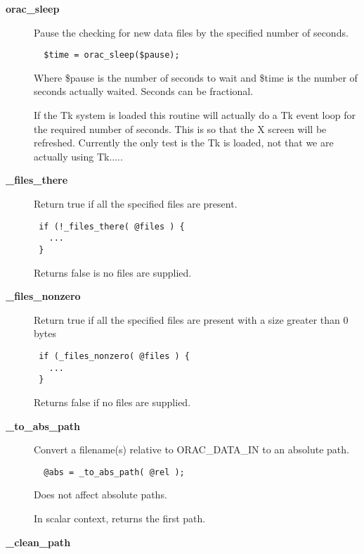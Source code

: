 \begin{description}
\begin{description}
\item[{\textbf{orac\_sleep}}] \mbox{}

Pause the checking for new data files by the specified number of seconds.

\begin{verbatim}
  $time = orac_sleep($pause);
\end{verbatim}


Where \$pause is the number of seconds to wait and \$time is the number
of seconds actually waited. Seconds can be fractional.



If the Tk system is loaded this routine will actually do a Tk event loop
for the required number of seconds. This is so that the X screen will
be refreshed. Currently the only test is the Tk is loaded, not that
we are actually using Tk.....


\item[{\textbf{\_files\_there}}] \mbox{}

Return true if all the specified files are present.

\begin{verbatim}
 if (!_files_there( @files ) {
   ...
 }
\end{verbatim}


Returns false is no files are supplied.


\item[{\textbf{\_files\_nonzero}}] \mbox{}

Return true if all the specified files are present with
a size greater than 0 bytes

\begin{verbatim}
 if (_files_nonzero( @files ) {
   ...
 }
\end{verbatim}


Returns false if no files are supplied.


\item[{\textbf{\_to\_abs\_path}}] \mbox{}

Convert a filename(s) relative to ORAC\_DATA\_IN to an absolute path.

\begin{verbatim}
  @abs = _to_abs_path( @rel );
\end{verbatim}


Does not affect absolute paths.



In scalar context, returns the first path.


\item[{\textbf{\_clean\_path}}] \mbox{}


\end{description}
\end{description}
